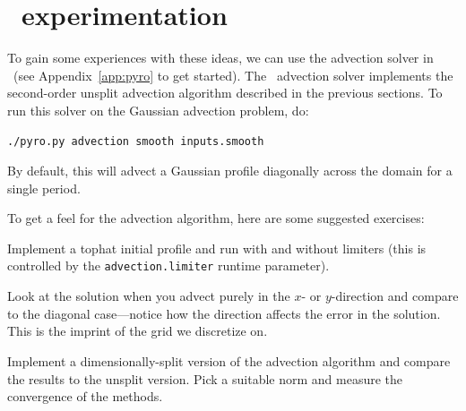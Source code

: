\section{\pyro\ experimentation}

To gain some experiences with these ideas, we can use the advection 
solver in \pyro\ (see Appendix~\ref{app:pyro} to get started).
The \pyro\ advection solver implements the second-order unsplit
advection algorithm described in the previous sections.  To run
this solver on the Gaussian advection problem, do:
\begin{verbatim}
./pyro.py advection smooth inputs.smooth
\end{verbatim}
By default, this will advect a Gaussian profile diagonally across the
domain for a single period.

To get a feel for the advection algorithm, here are some suggested
exercises:

\begin{exercise}
{Implement a tophat initial profile and run with and without limiters
  (this is controlled by the {\tt advection.limiter} runtime
  parameter).}
\end{exercise}

\begin{exercise}
{Look at the solution when you advect purely in the $x$- or
  $y$-direction and compare to the diagonal case---notice how the
  direction affects the error in the solution.  This is the imprint
  of the grid we discretize on.}
\end{exercise}

\begin{exercise}
{Implement a dimensionally-split version of the advection algorithm
and compare the results to the unsplit version.  Pick a suitable norm
and measure the convergence of the methods.}
\end{exercise}

